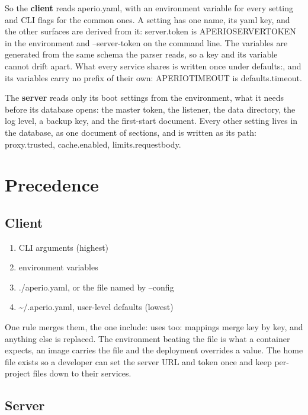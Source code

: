 \documentclass[11pt,a4paper,oneside]{book}
\newcommand{\aperiobreakableunderscore}{\textunderscore\allowbreak}
\newcommand{\aperiocodebreaks}{\XeTeXinterchartokenstate=1 }
\newcommand{\aperiocodebreaks}{}
\DeclareRobustCommand{\code}[1]{{\ttfamily\small\aperiocodebreaks
  \let\_\aperiobreakableunderscore#1}}
\begin{document}
So the \textbf{client} reads \code{aperio.yaml}, with an environment variable
for every setting and CLI flags for the common ones. A setting has one name,
its yaml key, and the other surfaces are derived from it: \code{server.token}
is \code{APERIO\_SERVER\_TOKEN} in the environment and \code{--server-token} on
the command line. The variables are generated from the same schema the parser
reads, so a key and its variable cannot drift apart. What every service shares
is written once under \code{defaults:}, and its variables carry no prefix of
their own: \code{APERIO\_TIMEOUT} is \code{defaults.timeout}.

The \textbf{server} reads only its boot settings from the environment, what it
needs before its database opens: the master token, the listener, the data
directory, the log level, a backup key, and the first-start document. Every
other setting lives in the database, as one document of sections, and is
written as its path: \code{proxy.trusted}, \code{cache.enabled},
\code{limits.request\_body}.

\section{Precedence}

\subsection*{Client}

\begin{enumerate}[leftmargin=1.5em]
  \item CLI arguments (highest)
  \item environment variables
  \item \code{./aperio.yaml}, or the file named by \code{--config}
  \item \code{\textasciitilde/.aperio.yaml}, user-level defaults (lowest)
\end{enumerate}

One rule merges them, the one \code{include:} uses too: mappings merge key
by key, and anything else is replaced. The environment beating the file is
what a container expects, an image carries the file and the deployment
overrides a value. The home file exists so a developer can set the server
URL and token once and keep per-project files down to their services.

\subsection*{Server}
\end{document}
